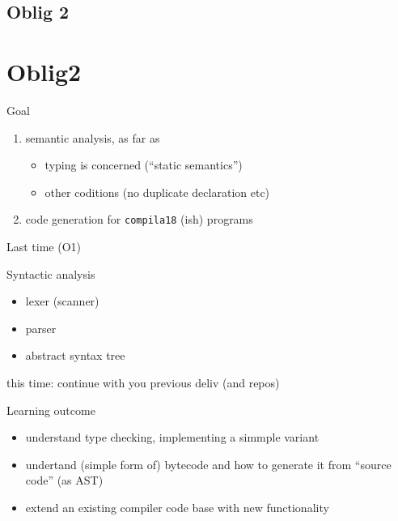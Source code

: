 \documentclass{beamer}
\begin{document}
\section{Oblig 2}
\chapter{Oblig2}
\label{sec:orgf1a58cf}


\begin{frame}[fragile,label={sec:org3d9078c}]{Goal}
 \begin{enumerate}
\item \alert{semantic  analysis}, as far as 
\begin{itemize}
\item \alert{typing} is concerned (``static semantics'')
\item other coditions (no duplicate declaration etc)
\end{itemize}

\item \alert{code generation} for \texttt{compila18} (ish) programs
\end{enumerate}
\end{frame}






\begin{frame}[label={sec:org5620cdf}]{Last time (O1)}
\begin{block}{Syntactic analysis}
\begin{itemize}
\item lexer (scanner)
\item parser
\item abstract syntax tree
\end{itemize}
\end{block}



\alert{this time}: continue with you previous deliv (and repos)
\end{frame}



\begin{frame}[label={sec:orgcfc9a7a}]{Learning outcome}
\begin{itemize}
\item understand type checking, implementing a simmple variant
\end{itemize}


\begin{itemize}
\item undertand (simple form of) bytecode and how to generate it from ``source
code'' (as AST)

\item extend an existing compiler code base with new functionality
\end{itemize}
\end{frame}
\end{document}
